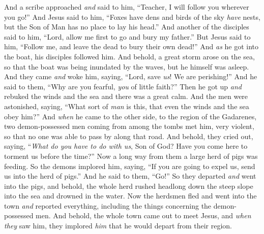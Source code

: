 \begin{biblechapter}
\verse And a scribe approached \textit{and} said to him, “Teacher, I will follow you wherever you go!”
\verse And Jesus said to him, “Foxes have dens and birds of the sky \textit{have} nests, but the Son of Man has no place to lay his head.”
\verse And another of the disciples said to him, “Lord, allow me first to go and bury my father.”
\verse But Jesus said to him, “Follow me, and leave the dead to bury their own dead!”
 And \textit{as} he got into the boat, his disciples followed him.
\verse And behold, a great storm arose on the sea, so that the boat was being inundated by the waves, but he himself was asleep.
\verse And they came \textit{and} woke him, saying, “Lord, save \textit{us}! We are perishing!”
\verse And he said to them, “Why are you fearful, \textit{you} of little faith?” Then he got up \textit{and} rebuked the winds and the sea and there was a great calm.
\verse And the men were astonished, saying, “What sort of \textit{man} is this, that even the winds and the sea obey him?”
 And \textit{when} he came to the other side, to the region of the Gadarenes, two demon-possessed men coming from among the tombs met him, very violent, so that no one was able to pass by along that road.
\verse And behold, they cried out, saying, “\textit{What do you have to do with us}, Son of God? Have you come here to torment us before the time?”
\verse Now a long way from them a large herd of pigs was feeding.
\verse So the demons implored him, saying, “If you are going to expel us, send us into the herd of pigs.”
\verse And he said to them, “Go!” So they departed \textit{and} went into the pigs, and behold, the whole herd rushed headlong down the steep slope into the sea and drowned in the water.
\verse Now the herdsmen fled and went into the town \textit{and} reported everything, including the things concerning the demon-possessed men.
\verse And behold, the whole town came out to meet Jesus, and \textit{when they} saw him, they implored \textit{him} that he would depart from their region.
\end{biblechapter}

